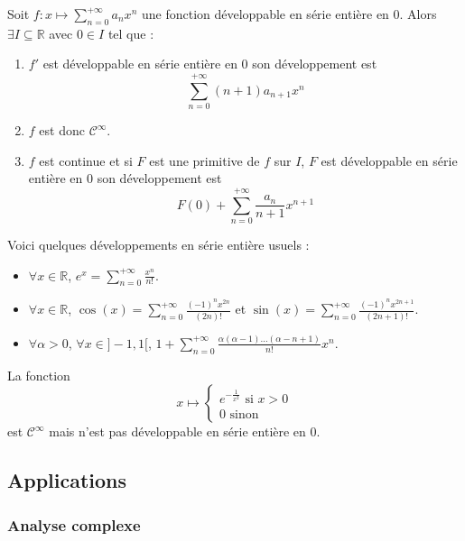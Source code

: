	\begin{proposition}
		Soit $f : x \mapsto \sum_{n=0}^{+\infty} a_n x^n$ une fonction développable en série entière en $0$. Alors $\exists I \subseteq \mathbb{R}$ avec $0 \in I$ tel que :
		\begin{enumerate}[label=(\roman*)]
			\item $f'$ est développable en série entière en $0$ son développement est
			\[ \sum_{n=0}^{+\infty} (n+1) a_{n+1} x^n \]
			\item $f$ est donc $\mathcal{C}^\infty$.
			\item $f$ est continue et si $F$ est une primitive de $f$ sur $I$, $F$ est développable en série entière en $0$ son développement est
			\[ F(0) + \sum_{n=0}^{+\infty} \frac{a_n}{n+1} x^{n+1} \]
		\end{enumerate}
	\end{proposition}

	\begin{example}
		Voici quelques développements en série entière usuels :
		\begin{itemize}
			\item $\forall x \in \mathbb{R}$, $e^x = \sum_{n=0}^{+\infty} \frac{x^n}{n!}$.
			\item $\forall x \in \mathbb{R}$, $\cos(x) = \sum_{n=0}^{+\infty} \frac{(-1)^n x^{2n}}{(2n)!}$ et $\sin(x) = \sum_{n=0}^{+\infty} \frac{(-1)^n x^{2n+1}}{(2n+1)!}$.
			\item $\forall \alpha > 0$, $\forall x \in ]-1,1[$, $1 + \sum_{n=0}^{+\infty} \frac{\alpha(\alpha - 1) \dots (\alpha - n + 1)}{n!} x^n$.
		\end{itemize}
	\end{example}


	\begin{cexample}
		La fonction
		\[
		x \mapsto \begin{cases}
			e^{-\frac{1}{x^2}} \text{ si } x > 0 \\
			0 \text{ sinon}
		\end{cases}
		\]
		est $\mathcal{C}^\infty$ mais n'est pas développable en série entière en $0$.
	\end{cexample}

	\subsection{Applications}

	\subsubsection{Analyse complexe}

